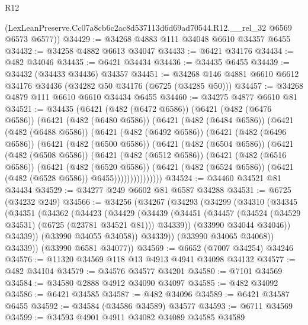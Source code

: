 \begin{lexlean}{R12}
\begin{coremodule}
      (LexLeanPreserve.Cc07a8cb6c2ac8d537113d6d69ad70544.R12.__rel_32 @6569 @6573 @6577))
@34429 := @34268 @4883 @111 @34048 @6610 @34357 @6455
@34432 := @34258 @4882 @6613 @34047
@34433 := @6421 @34176
@34434 := @482 @34046
@34435 := @6421 @34434
@34436 := @34435 @6455
@34439 := @34432 (@34433 @34436) @34357
@34451 := @34268 @146 @4881 @6610 @6612 @34176 @34436 (@34282 @50 @34176 (@6725 (@34285 @50)))
@34457 := @34268 @4879 @111 @6610 @6610 @34434 @6455
@34460 := @34275 @4877 @6610 @81
@34521 := @34435
    (@6421
      (@482 (@6472 @6586))
      (@6421
        (@482 (@6476 @6586))
        (@6421
          (@482 (@6480 @6586))
          (@6421
            (@482 (@6484 @6586))
            (@6421
              (@482 (@6488 @6586))
              (@6421
                (@482 (@6492 @6586))
                (@6421
                  (@482 (@6496 @6586))
                  (@6421
                    (@482 (@6500 @6586))
                    (@6421
                      (@482 (@6504 @6586))
                      (@6421
                        (@482 (@6508 @6586))
                        (@6421
                          (@482 (@6512 @6586))
                          (@6421
                            (@482 (@6516 @6586))
                            (@6421
                              (@482 (@6520 @6586))
                              (@6421
                                (@482 (@6524 @6586))
                                (@6421 (@482 (@6528 @6586)) @6455)))))))))))))))
@34524 := @34460 @34521 @81 @34434
@34529 := @34277 @249 @6602 @81 @6587 @34288
@34531 := @6725 (@34232 @249)
@34566 := @34256
    (@34267
      (@34293
        (@34299
          (@34310
            (@34345
              (@34351
                (@34362
                  (@34423
                    (@34429
                      (@34439
                        (@34451
                          (@34457 (@34524 (@34529 @34531) (@6725 (@23781 @34521 @81))) @34339))
                        (@33990 @34044 @34046))
                      @34339))
                  (@33990 @34055 @34058))
                @34339))
            (@33990 @34065 @34068))
          @34339))
      (@33990 @6581 @34077))
@34569 := @6652 (@7007 @34254) @34246
@34576 := @11320 @34569 @118 @13 @4913 @4941 @34098 @34132
@34577 := @482 @34104
@34579 := @34576 @34577 @34201
@34580 := @7101 @34569
@34584 := @34580 @2888 @4912 @34090 @34097
@34585 := @482 @34092
@34586 := @6421 @34585
@34587 := @482 @34096
@34589 := @6421 @34587 @6455
@34592 := @34584 (@34586 @34589) @34577
@34593 := @6711 @34569
@34599 := @34593 @4901 @4911 @34082 @34089 @34585 @34589

\end{coremodule}
\end{lexlean}
